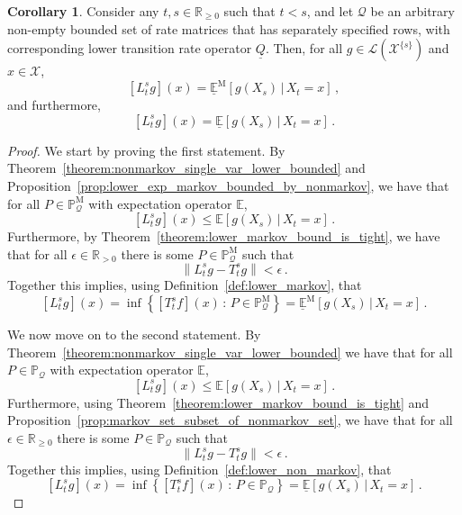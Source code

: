 \documentclass[10pt]{paper}
\theoremstyle{definition}
\newtheorem{corollary}[theorem]{Corollary}
\newcommand{\reals}{\mathbb{R}}
\newcommand{\realspos}{\reals_{>0}}
\newcommand{\realsnonneg}{\reals_{\geq 0}}
\newcommand{\states}{\mathcal{X}}
\newcommand{\processes}{\mathbb{P}}
\newcommand{\mprocesses}{\processes^{\mathrm{M}}}
\newcommand{\gambles}{\mathcal{L}}
\newcommand{\rateset}{\mathcal{Q}}
\newcommand{\lrate}{\underline{Q}}
\newcommand{\norm}[1]{\left\lVert #1 \right\rVert}
\begin{document}
\begin{corollary}\label{cor:lower_operator_is_infimum}
Consider any $t,s\in\realsnonneg$ such that $t<s$, and let $\rateset$ be an arbitrary non-empty bounded set of rate matrices that has separately specified rows, with corresponding lower transition rate operator $\lrate$. Then, for all $g\in\gambles(\states^{\{s\}})$ and $x\in\states$,
\begin{equation*}
\left[L_t^sg\right](x) = \underline{\mathbb{E}}^\mathrm{M}[g(X_s)\,\vert\,X_t=x]\,,%
\end{equation*}
and furthermore,
\begin{equation*}
\left[L_t^sg\right](x) = \underline{\mathbb{E}}[g(X_s)\,\vert\,X_t=x]\,.%
\end{equation*}
\end{corollary}
\begin{proof}
We start by proving the first statement. By Theorem~\ref{theorem:nonmarkov_single_var_lower_bounded} and Proposition~\ref{prop:lower_exp_markov_bounded_by_nonmarkov}, we have that for all $P\in\mprocesses_\rateset$ with expectation operator $\mathbb{E}$,
\begin{equation*}
\left[L_t^sg\right](x) \leq \mathbb{E}[g(X_s)\,\vert\,X_t=x]\,.
\end{equation*}
Furthermore, by Theorem~\ref{theorem:lower_markov_bound_is_tight}, we have that for all $\epsilon\in\realspos$ there is some $P\in\mprocesses_\rateset$ such that
\begin{equation*}
\norm{L_t^sg - T_t^sg} < \epsilon\,.
\end{equation*}
Together this implies, using Definition~\ref{def:lower_markov}, that
\begin{equation*}
\left[L_t^sg\right](x) = \inf\left\{\left[T_t^sf\right](x)\,:\,P\in\mprocesses_\rateset\right\} = \underline{\mathbb{E}}^{\mathrm{M}}\left[g(X_s)\,\vert\,X_t=x\right]\,.
\end{equation*}

We now move on to the second statement. By Theorem~\ref{theorem:nonmarkov_single_var_lower_bounded} we have that for all $P\in\processes_\rateset$ with expectation operator $\mathbb{E}$,
\begin{equation*}
\left[L_t^sg\right](x) \leq \mathbb{E}[g(X_s)\,\vert\,X_t=x]\,.
\end{equation*}
Furthermore, using Theorem~\ref{theorem:lower_markov_bound_is_tight} and Proposition~\ref{prop:markov_set_subset_of_nonmarkov_set}, we have that for all $\epsilon\in\realsnonneg$ there is some $P\in\processes_\rateset$ such that
\begin{equation*}
\norm{L_t^sg - T_t^sg} < \epsilon\,.
\end{equation*}
Together this implies, using Definition~\ref{def:lower_non_markov}, that
\begin{equation*}
\left[L_t^sg\right](x) = \inf\left\{\left[T_t^sf\right](x)\,:\,P\in\processes_\rateset\right\} = \underline{\mathbb{E}}\left[g(X_s)\,\vert\,X_t=x\right]\,.
\end{equation*}
\end{proof}
\end{document}
